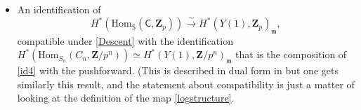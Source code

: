 \documentclass[10pt]{amsart}
\newcommand{\Z}{\mathbf{Z}}
\newcommand{\Hom}{\mathrm{Hom}}
\newcommand{\Frob}{\mathrm{Frob}}
\newcommand{\Cinf}{\mathsf{C}}
\newcommand{\Sinf}{\mathsf{S}}
\theoremstyle{remark}
\begin{document}
\begin{itemize}
\item[(f)]   An identification of  \begin{equation} \label{logstructure} H^*(\Hom_{\Sinf}(\Cinf, \Z_p)) \stackrel{\sim}{\longrightarrow} H^*(Y(1), \Z_p)_{\mathfrak{m}},\end{equation}   
compatible under \eqref{Descent} with 
the identification $H^*(\Hom_{S_n}(C_n, \Z/p^n)) \simeq H^*(Y(1), \Z/p^n)_{\mathfrak{m}}$
that is the composition of \eqref{id4} with the pushforward. (This is described in dual form in \cite[Theorem 13.1(d)]{GV} but one gets
similarly this result, and the statement about compatibility is just a matter of looking at the definition of the map \eqref{logstructure}. 

\end{itemize}
\end{document}
